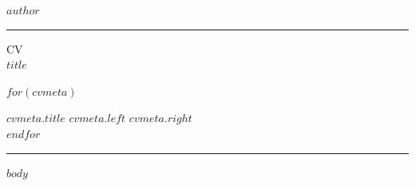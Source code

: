 \documentclass[10pt,A4]{article}
\newcommand{\metasection}[2]
{
\footnotesize{#2} \hspace*{\fill} \footnotesize{#1}\\[1pt]
}
\newcommand{\mystrut}{\rule[-.3\baselineskip]{0pt}{\baselineskip}}
\begin{document}
\pagestyle{fancy}

\vspace{-8pt}
\begin{center}
	\HUGE \textsc{$author$} \textcolor{sectcol}{\rule[-1mm]{1mm}{0.9cm}} \textsc{CV}\\[2pt]
	\small $title$
\end{center}

\vspace{6pt}

$for(cvmeta)$
\metasection{$cvmeta.right$}{\textbf{$cvmeta.title$} $cvmeta.left$}
$endfor$

\vspace{-2pt}
\textcolor{softcol}{\hrule}
\vspace{6pt}

\normalsize

\vspace{-6pt}
$body$


\null
\vspace*{\fill}
\hspace{-0.25\linewidth}\colorbox{white}{\makebox[1.5\linewidth][c]{\mystrut  \textnormal{\textcolor{sectcol}{$cvfooter.left$}  *  \textcolor{sectcol}{$cvfooter.right$}}}}
\end{document}
